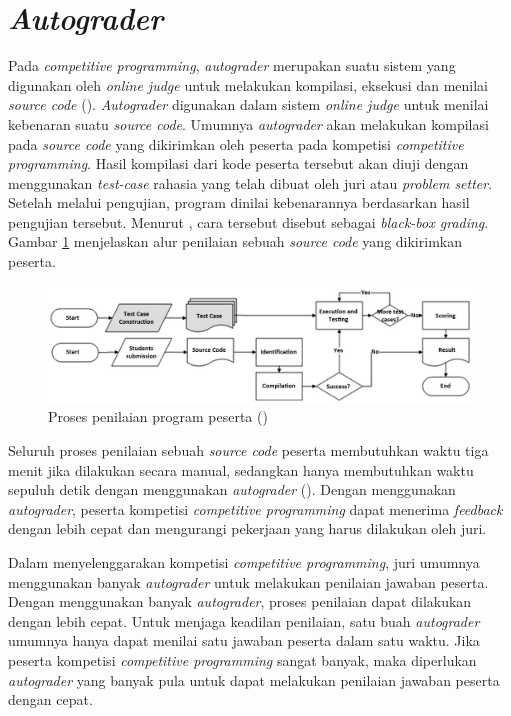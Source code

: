 \section{\textit{Autograder}}

\par Pada \textit{competitive programming}, \textit{autograder} merupakan suatu sistem yang digunakan oleh \textit{online judge} untuk melakukan kompilasi, eksekusi dan menilai \textit{source code} (\cite{danutamalms}). \textit{Autograder} digunakan dalam sistem \textit{online judge} untuk menilai kebenaran suatu \textit{source code}. Umumnya \textit{autograder} akan melakukan kompilasi pada \textit{source code} yang dikirimkan oleh peserta pada kompetisi \textit{competitive programming}. Hasil kompilasi dari kode peserta tersebut akan diuji dengan menggunakan \textit{test-case} rahasia yang telah dibuat oleh juri atau \textit{problem setter}. Setelah melalui pengujian, program dinilai kebenarannya berdasarkan hasil pengujian tersebut. Menurut \cite{jordanioi}, cara tersebut disebut sebagai \textit{black-box grading}. Gambar \ref{fig:grading-process} menjelaskan alur penilaian sebuah \textit{source code} yang dikirimkan peserta.

\begin{figure}
	\centering
	\includegraphics[width=\textwidth]{images/grading-process}
	\caption{Proses penilaian program peserta (\cite{danutamalms})}
	\label{fig:grading-process}
\end{figure}

\par Seluruh proses penilaian sebuah \textit{source code} peserta membutuhkan waktu tiga menit jika dilakukan secara manual, sedangkan hanya membutuhkan waktu sepuluh detik dengan menggunakan \textit{autograder} (\cite{danutamalms}). Dengan menggunakan \textit{autograder}, peserta kompetisi \textit{competitive programming} dapat menerima \textit{feedback} dengan lebih cepat dan mengurangi pekerjaan yang harus dilakukan oleh juri.

\par Dalam menyelenggarakan kompetisi \textit{competitive programming}, juri umumnya menggunakan banyak \textit{autograder} untuk melakukan penilaian jawaban peserta. Dengan menggunakan banyak \textit{autograder}, proses penilaian dapat dilakukan dengan lebih cepat. Untuk menjaga keadilan penilaian, satu buah \textit{autograder} umumnya hanya dapat menilai satu jawaban peserta dalam satu waktu. Jika peserta kompetisi \textit{competitive programming} sangat banyak, maka diperlukan \textit{autograder} yang banyak pula untuk dapat melakukan penilaian jawaban peserta dengan cepat.

